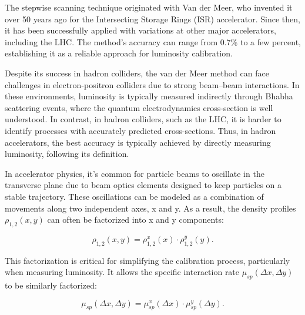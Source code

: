 The stepwise scanning technique originated with Van der Meer, who invented it over 50 years ago for the Intersecting Storage Rings (ISR) accelerator\cite{Carboni:156499}. Since then, it has been successfully applied with variations at other major accelerators\cite{Rubbia:1025746}, including the LHC. The method's accuracy can range from 0.7\% to a few percent, establishing it as a reliable approach for luminosity calibration.

Despite its success in hadron colliders, the van der Meer method can face challenges in electron-positron colliders due to strong beam–beam interactions. In these environments, luminosity is typically measured indirectly through Bhabha scattering events, where the quantum electrodynamics cross-section is well understood. In contrast, in hadron colliders, such as the LHC, it is harder to identify processes with accurately predicted cross-sections. Thus, in hadron accelerators, the best accuracy is typically achieved by directly measuring luminosity, following its definition.

In accelerator physics, it's common for particle beams to oscillate in the transverse plane due to beam optics elements designed to keep particles on a stable trajectory. These oscillations can be modeled as a combination of movements along two independent axes, x and y. As a result, the density profiles \(\rho _{1,2}(x, y)\) can often be factorized into x and y components:

\begin{equation}
\rho _{1,2}(x, y) = \rho _{1,2}^x(x) \cdot \rho _{1,2}^y(y).
\end{equation}

This factorization is critical for simplifying the calibration process, particularly when measuring luminosity. It allows the specific interaction rate \(\mu_{sp}(\Delta x, \Delta y)\) to be similarly factorized:

\begin{equation}
\mu _{sp}(\Delta x, \Delta y) = \mu ^x_{sp}(\Delta x) \cdot \mu ^y_{sp}(\Delta y).
\end{equation}

